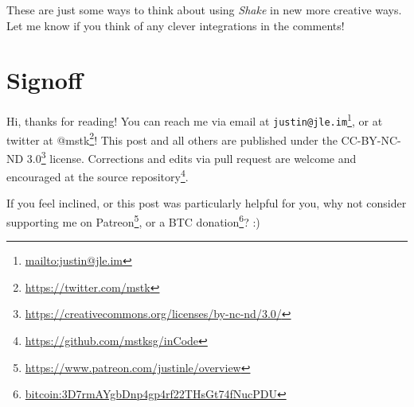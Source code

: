 \documentclass[]{article}
\renewcommand{\href}[2]{#2\footnote{\url{#1}}}
\begin{document}
These are just some ways to think about using \emph{Shake} in new more creative
ways. Let me know if you think of any clever integrations in the comments!

\section{Signoff}\label{signoff}

Hi, thanks for reading! You can reach me via email at
\href{mailto:justin@jle.im}{\nolinkurl{justin@jle.im}}, or at twitter at
\href{https://twitter.com/mstk}{@mstk}! This post and all others are published
under the \href{https://creativecommons.org/licenses/by-nc-nd/3.0/}{CC-BY-NC-ND
3.0} license. Corrections and edits via pull request are welcome and encouraged
at \href{https://github.com/mstksg/inCode}{the source repository}.

If you feel inclined, or this post was particularly helpful for you, why not
consider \href{https://www.patreon.com/justinle/overview}{supporting me on
Patreon}, or a \href{bitcoin:3D7rmAYgbDnp4gp4rf22THsGt74fNucPDU}{BTC donation}?
:)
\end{document}

